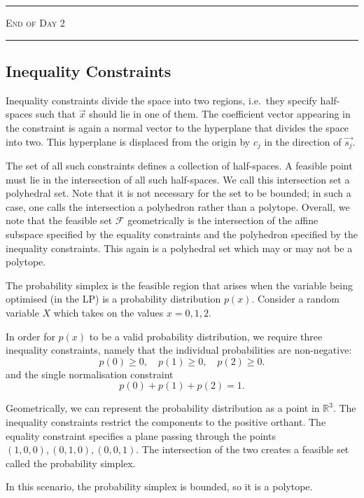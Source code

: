 \begin{center}
    {\color{quantumdeep}
        \rule{\linewidth}{0.6pt}

        \scshape\Large End of Day 2

        \rule{\linewidth}{0.6pt}}
\end{center}

\subsection{Inequality Constraints}

Inequality constraints divide the space into two regions, i.e.\ they specify half-spaces such that $\vec{x}$ should lie in one of them. The coefficient vector appearing in the constraint is again a normal vector to the hyperplane that divides the space into two.
This hyperplane is displaced from the origin by $c_j$ in the direction of $\vec{s_j}$.

The set of all such constraints defines a collection of half-spaces. A feasible point must lie in the intersection of all such half-spaces.
We call this intersection set a polyhedral set. Note that it is not necessary for the set to be bounded; in such a case, one calls the intersection a polyhedron rather than a polytope.
Overall, we note that the feasible set $\mathcal{F}$ geometrically is the intersection of the affine subspace specified by the equality constraints and the polyhedron specified by the inequality constraints. This again is a polyhedral set which may or may not be a polytope.

The probability simplex is the feasible region that arises when the variable being optimised (in the LP) is a probability distribution $p(x)$. Consider a random variable $X$ which takes on the values $x = 0,1,2$.

In order for $p(x)$ to be a valid probability distribution, we require three inequality constraints, namely that the individual probabilities are non-negative:
\[
    p(0) \ge 0,\quad p(1) \ge 0,\quad p(2) \ge 0.
\]
and the single normalisation constraint
\[
    p(0)+p(1)+p(2)=1.
\]

Geometrically, we can represent the probability distribution as a point in $\mathbb{R}^3$. The inequality constraints restrict the components to the positive orthant.
The equality constraint specifies a plane passing through the points $(1,0,0), (0,1,0), (0,0,1)$. The intersection of the two creates a feasible set called the probability simplex.

In this scenario, the probability simplex is bounded, so it is a polytope.

